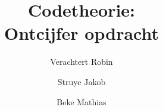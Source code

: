 \documentclass[a4paper,11pt]{article}
\author{
  Verachtert Robin\\
  \and
  Struye Jakob\\
  \and
  Beke Mathias\\
}
\title{Codetheorie: \\Ontcijfer opdracht}
\begin{document}
\maketitle
\tableofcontents
\pagebreak






\end{document}
